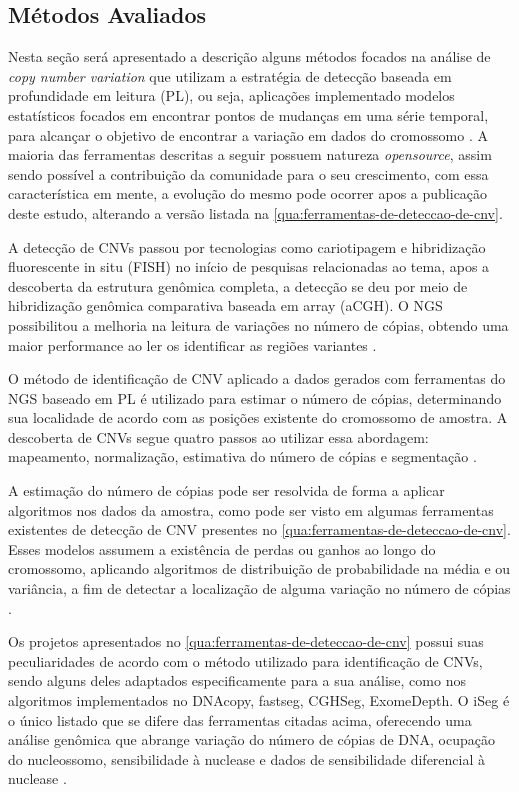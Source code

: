 \subsection{Métodos Avaliados} 

Nesta seção será apresentado a descrição alguns métodos focados na análise de \textit{copy number variation} que utilizam a estratégia de detecção baseada em profundidade em leitura (PL), ou seja, aplicações implementado modelos estatísticos focados em encontrar pontos de mudanças em uma série temporal, para alcançar o objetivo de encontrar a variação em dados do cromossomo \cite{Zhao2013}. A maioria das ferramentas descritas a seguir possuem natureza \textit{opensource}, assim sendo possível a contribuição da comunidade para o seu crescimento, com essa característica em mente, a evolução do mesmo pode ocorrer apos a publicação deste estudo, alterando a versão listada na \autoref{qua:ferramentas-de-deteccao-de-cnv}.


A detecção de CNVs passou por tecnologias como cariotipagem e hibridização fluorescente in situ (FISH) no início de pesquisas relacionadas ao tema, apos a descoberta da estrutura genômica completa, a detecção se deu por meio de hibridização genômica comparativa baseada em array (aCGH). O NGS possibilitou a melhoria na leitura de variações no número de cópias, obtendo uma maior performance ao ler os identificar as regiões variantes \cite{Zhao2013}. 

O método de identificação de CNV aplicado a dados gerados com ferramentas do NGS baseado em PL é utilizado para estimar o número de cópias, determinando sua localidade de acordo com as posições existente do cromossomo de amostra. A descoberta de CNVs segue quatro passos ao utilizar essa abordagem: mapeamento, normalização, estimativa do número de cópias e segmentação \cite{Zhao2013}.

A estimação do número de cópias pode ser resolvida de forma a aplicar algoritmos nos dados da amostra, como pode ser visto em algumas ferramentas existentes de detecção de CNV presentes no \autoref{qua:ferramentas-de-deteccao-de-cnv}. Esses modelos assumem a existência de perdas ou ganhos ao longo do cromossomo, aplicando algoritmos de distribuição de probabilidade na média e ou variância, a fim de detectar a localização de alguma variação no número de cópias \cite{Zhao2013}.




Os projetos apresentados no \autoref{qua:ferramentas-de-deteccao-de-cnv} possui suas peculiaridades de acordo com o método utilizado para identificação de CNVs, sendo alguns deles adaptados especificamente para a sua análise, como nos algoritmos implementados no DNAcopy, fastseg, CGHSeg, ExomeDepth. O iSeg é o único listado que se difere das ferramentas citadas acima, oferecendo uma análise genômica que abrange variação do número de cópias de DNA, ocupação do nucleossomo, sensibilidade à nuclease e dados de sensibilidade diferencial à nuclease \cite{Girimurugan2018}. 

